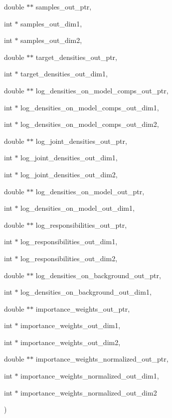 {\begin{DoxyParamCaption}
\item[{double $\ast$$\ast$}]{samples\+\_\+out\+\_\+ptr, }
\item[{int $\ast$}]{samples\+\_\+out\+\_\+dim1, }
\item[{int $\ast$}]{samples\+\_\+out\+\_\+dim2, }
\item[{double $\ast$$\ast$}]{target\+\_\+densities\+\_\+out\+\_\+ptr, }
\item[{int $\ast$}]{target\+\_\+densities\+\_\+out\+\_\+dim1, }
\item[{double $\ast$$\ast$}]{log\+\_\+densities\+\_\+on\+\_\+model\+\_\+comps\+\_\+out\+\_\+ptr, }
\item[{int $\ast$}]{log\+\_\+densities\+\_\+on\+\_\+model\+\_\+comps\+\_\+out\+\_\+dim1, }
\item[{int $\ast$}]{log\+\_\+densities\+\_\+on\+\_\+model\+\_\+comps\+\_\+out\+\_\+dim2, }
\item[{double $\ast$$\ast$}]{log\+\_\+joint\+\_\+densities\+\_\+out\+\_\+ptr, }
\item[{int $\ast$}]{log\+\_\+joint\+\_\+densities\+\_\+out\+\_\+dim1, }
\item[{int $\ast$}]{log\+\_\+joint\+\_\+densities\+\_\+out\+\_\+dim2, }
\item[{double $\ast$$\ast$}]{log\+\_\+densities\+\_\+on\+\_\+model\+\_\+out\+\_\+ptr, }
\item[{int $\ast$}]{log\+\_\+densities\+\_\+on\+\_\+model\+\_\+out\+\_\+dim1, }
\item[{double $\ast$$\ast$}]{log\+\_\+responsibilities\+\_\+out\+\_\+ptr, }
\item[{int $\ast$}]{log\+\_\+responsibilities\+\_\+out\+\_\+dim1, }
\item[{int $\ast$}]{log\+\_\+responsibilities\+\_\+out\+\_\+dim2, }
\item[{double $\ast$$\ast$}]{log\+\_\+densities\+\_\+on\+\_\+background\+\_\+out\+\_\+ptr, }
\item[{int $\ast$}]{log\+\_\+densities\+\_\+on\+\_\+background\+\_\+out\+\_\+dim1, }
\item[{double $\ast$$\ast$}]{importance\+\_\+weights\+\_\+out\+\_\+ptr, }
\item[{int $\ast$}]{importance\+\_\+weights\+\_\+out\+\_\+dim1, }
\item[{int $\ast$}]{importance\+\_\+weights\+\_\+out\+\_\+dim2, }
\item[{double $\ast$$\ast$}]{importance\+\_\+weights\+\_\+normalized\+\_\+out\+\_\+ptr, }
\item[{int $\ast$}]{importance\+\_\+weights\+\_\+normalized\+\_\+out\+\_\+dim1, }
\item[{int $\ast$}]{importance\+\_\+weights\+\_\+normalized\+\_\+out\+\_\+dim2}
\end{DoxyParamCaption}
)}\hypertarget{classVIPS__PythonWrapper_af3f8d3af3549a8296eecc25a115c31f8}{}\label{classVIPS__PythonWrapper_af3f8d3af3549a8296eecc25a115c31f8}
